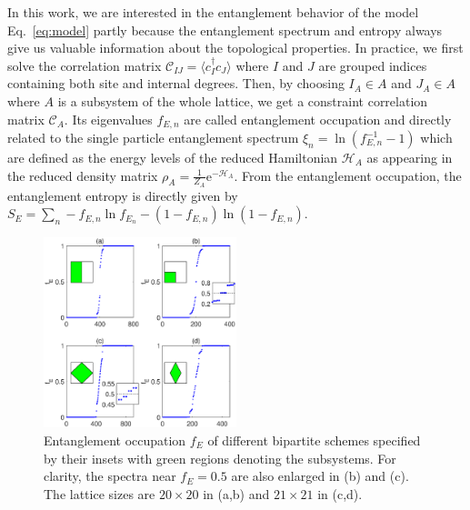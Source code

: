 \documentclass[twocolumn,superscriptaddress]{revtex4-1}
\newcommand{\me}{\mathrm{e}}
\begin{document}
In this work, we are interested in the entanglement behavior of the model Eq.~\ref{eq:model} partly because the entanglement spectrum and entropy always give us valuable information about the topological properties. In practice, we first solve the correlation matrix $\mathcal{C}_{IJ}=\langle c_I^\dag c_J \rangle$ where $I$ and $J$ are grouped indices containing both site and internal degrees. Then, by choosing $I_A\in A$ and $J_A\in A$ where $A$ is a subsystem of the whole lattice, we get a constraint correlation matrix $\mathcal{C}_A$. \cite{Peschel_JPAMG_2003, Ryu_PRB_2006} Its eigenvalues $f_{E,n}$ are called entanglement occupation and directly related to the single particle entanglement spectrum $\xi_n=\ln\left(f_{E,n}^{-1}-1\right)$ which are defined as the energy levels of the reduced Hamiltonian $\mathcal{H}_A$ as appearing in the reduced density matrix $\rho_A=\frac{1}{Z_A}\me^{-\mathcal{H}_A}$. From the entanglement occupation, the entanglement entropy is directly given by $S_E=\sum_n -f_{E,n}\ln f_{E_n} - (1-f_{E,n})\ln(1-f_{E,n}) $. 

\begin{figure}
    \includegraphics[width=0.5\textwidth]{subshape.eps}
    \caption{\label{fig:subshape} Entanglement occupation $f_E$ of different bipartite schemes specified by their insets with green regions denoting the subsystems. For clarity, the spectra near $f_E=0.5$ are also enlarged in (b) and (c). The lattice sizes are $20\times20$ in (a,b) and $21\times21$ in (c,d).}
\end{figure}
\end{document}
